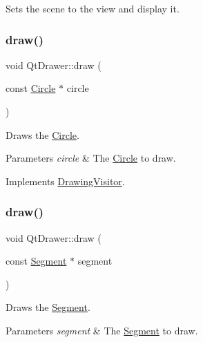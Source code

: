 Sets the scene to the view and display it. \hypertarget{class_qt_drawer_a1e9a6ad76355f26fc9b41b54b28a04f4}{}\label{class_qt_drawer_a1e9a6ad76355f26fc9b41b54b28a04f4} 
\subsubsection{\texorpdfstring{draw()}{draw()}\hspace{0.1cm}{\footnotesize\ttfamily [1/5]}}
{\footnotesize\ttfamily void Qt\+Drawer\+::draw (\begin{DoxyParamCaption}\item[{const \hyperlink{class_circle}{Circle} $\ast$}]{circle }\end{DoxyParamCaption})\hspace{0.3cm}{\ttfamily [virtual]}}

Draws the \hyperlink{class_circle}{Circle}. 
\begin{DoxyParams}{Parameters}
{\em circle} & The \hyperlink{class_circle}{Circle} to draw. \\
\hline
\end{DoxyParams}


Implements \hyperlink{class_drawing_visitor_a287f6d770c755c1c3bc144fb08b65030}{Drawing\+Visitor}.

\hypertarget{class_qt_drawer_afe2f299e83092e1d4676c8b3fd4a3452}{}\label{class_qt_drawer_afe2f299e83092e1d4676c8b3fd4a3452} 
\subsubsection{\texorpdfstring{draw()}{draw()}\hspace{0.1cm}{\footnotesize\ttfamily [2/5]}}
{\footnotesize\ttfamily void Qt\+Drawer\+::draw (\begin{DoxyParamCaption}\item[{const \hyperlink{class_segment}{Segment} $\ast$}]{segment }\end{DoxyParamCaption})\hspace{0.3cm}{\ttfamily [virtual]}}

Draws the \hyperlink{class_segment}{Segment}. 
\begin{DoxyParams}{Parameters}
{\em segment} & The \hyperlink{class_segment}{Segment} to draw. \\
\hline
\end{DoxyParams}


